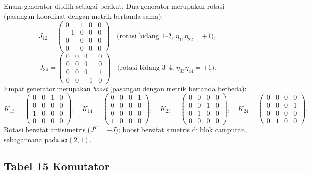 Enam generator dipilih sebagai berikut. Dua generator merupakan rotasi (pasangan koordinat dengan metrik bertanda sama):
\begin{equation}\label{a3-eq:J12}
    J_{12} = \begin{pmatrix}0&1&0&0\\-1&0&0&0\\0&0&0&0\\0&0&0&0\end{pmatrix}
    \quad\text{(rotasi bidang 1--2, $\eta_{11}\eta_{22} = +1$)},
\end{equation}
\begin{equation}\label{a3-eq:J34}
    J_{34} = \begin{pmatrix}0&0&0&0\\0&0&0&0\\0&0&0&1\\0&0&-1&0\end{pmatrix}
    \quad\text{(rotasi bidang 3--4, $\eta_{33}\eta_{44} = +1$)}.
\end{equation}
Empat generator merupakan \emph{boost} (pasangan dengan metrik bertanda berbeda):
\begin{equation}\label{a3-eq:boosts}
    K_{13} = \begin{pmatrix}0&0&1&0\\0&0&0&0\\1&0&0&0\\0&0&0&0\end{pmatrix},\quad
    K_{14} = \begin{pmatrix}0&0&0&1\\0&0&0&0\\0&0&0&0\\1&0&0&0\end{pmatrix},\quad
    K_{23} = \begin{pmatrix}0&0&0&0\\0&0&1&0\\0&1&0&0\\0&0&0&0\end{pmatrix},\quad
    K_{24} = \begin{pmatrix}0&0&0&0\\0&0&0&1\\0&0&0&0\\0&1&0&0\end{pmatrix}.
\end{equation}
Rotasi bersifat antisimetris ($J^T = -J$); boost bersifat simetris di blok campuran, sebagaimana pada $\mathfrak{so}(2,1)$.

\subsection{Tabel 15 Komutator}

